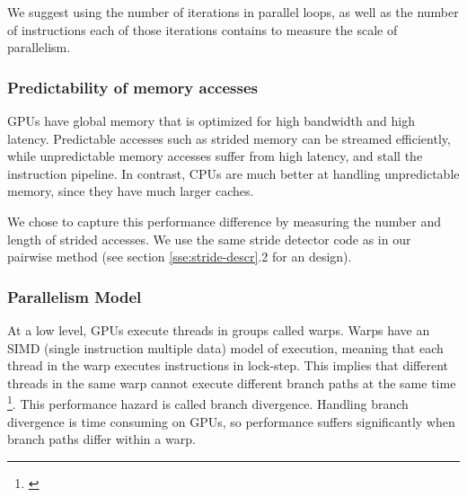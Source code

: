 \documentclass[12pt,twoside]{reedthesis}
\begin{document}
		We suggest using the number of iterations in parallel loops, as well as the number of instructions each of those iterations contains to measure the scale of parallelism.
		
		
		
		
		\subsubsection{Predictability of memory accesses}
		
		
		GPUs have global memory that is optimized for high bandwidth and high latency. Predictable accesses such as strided memory can be streamed efficiently, while unpredictable memory accesses suffer from high latency, and stall the instruction pipeline. 
		In contrast, CPUs are much better at handling unpredictable memory, since they have much larger caches. %
		
		We chose to capture this performance difference by measuring the number and length of strided accesses. 
		We use the same stride detector code as in our pairwise method (see section \ref{sse:stride-descr}.2 for an design). 
		
		
		\subsubsection{Parallelism Model}
		
		At a low level, GPUs execute threads in groups called warps. Warps have an SIMD (single instruction multiple data) model of execution, meaning that each thread in the warp executes instructions in lock-step. This implies that different threads in the same warp cannot execute different branch paths at the same time \footnote{\cite{Fung:2007:DWF:1331699.1331735}}. This performance hazard is called  branch divergence. Handling branch divergence is time consuming on GPUs, so performance suffers significantly when branch paths differ within a warp.
		
\end{document}
